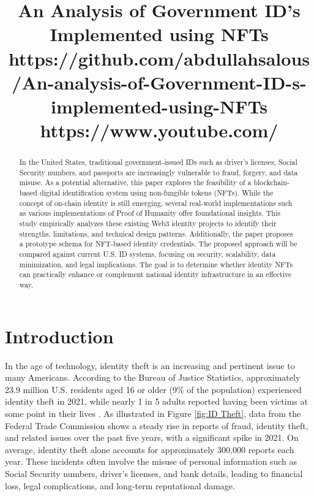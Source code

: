 \documentclass[conference]{IEEEtran}
\begin{document}
\title {An Analysis of Government ID’s Implemented using NFTs \\[1ex] \large https://github.com/abdullahsalous/An-analysis-of-Government-ID-s-implemented-using-NFTs \\[1ex] \large https://www.youtube.com/}

\author{
}

\maketitle

\begin{abstract}
In the United States, traditional government-issued IDs such as driver's licenses, Social Security numbers, and passports are increasingly vulnerable to fraud, forgery, and data misuse. As a potential alternative, this paper explores the feasibility of a blockchain-based digital identification system using non-fungible tokens (NFTs). While the concept of on-chain identity is still emerging, several real-world implementations such as various implementations of Proof of Humanity offer foundational insights. This study empirically analyzes these existing Web3 identity projects to identify their strengths, limitations, and technical design patterns. Additionally, the paper proposes a prototype schema for NFT-based identity credentials. The proposed approach will be compared against current U.S. ID systems, focusing on security, scalability, data minimization, and legal implications. The goal is to determine whether identity NFTs can practically enhance or complement national identity infrastructure in an effective way.
\end{abstract}

\section{Introduction}
In the age of technology, identity theft is an increasing and pertinent issue to many Americans. According to the Bureau of Justice Statistics, approximately 23.9 million U.S. residents aged 16 or older (9\% of the population) experienced identity theft in 2021, while nearly 1 in 5 adults reported having been victims at some point in their lives \cite{Bureau of Justice Statistics}. As illustrated in Figure \ref{fig:ID Theft}, data from the Federal Trade Commission shows a steady rise in reports of fraud, identity theft, and related issues over the past five years, with a significant spike in 2021. On average, identity theft alone accounts for approximately 300,000 reports each year. These incidents often involve the misuse of personal information such as Social Security numbers, driver's licenses, and bank details, leading to financial loss, legal complications, and long-term reputational damage. 
\end{document}
